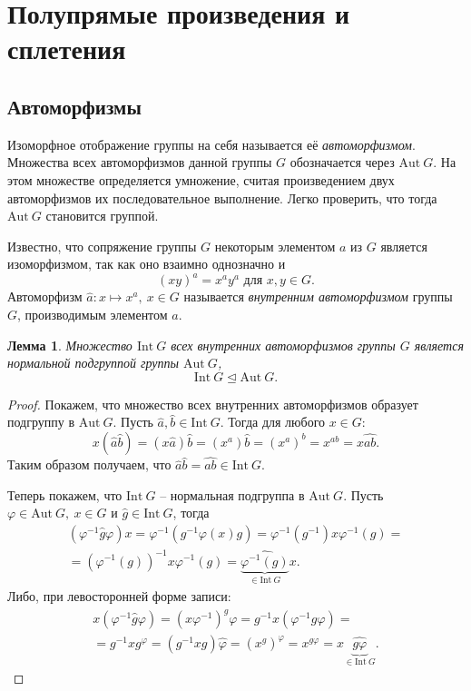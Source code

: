 \documentclass{article}
\newtheorem{lemma}{Лемма}[section]
\begin{document}
\newpage

\section{Полупрямые произведения и сплетения}

\subsection{Автоморфизмы}

Изоморфное отображение группы на себя называется её \textit{автоморфизмом}. Множества всех автоморфизмов данной группы $G$ обозначается через $\mathrm{Aut} \ G$. На этом множестве определяется умножение, считая произведением двух автоморфизмов их последовательное выполнение. Легко проверить, что тогда $\mathrm{Aut} \ G$ становится группой.

Известно, что сопряжение группы $G$ некоторым элементом $a$ из $G$ является изоморфизмом, так как оно взаимно однозначно и $$ (xy)^a = x^a y^a \text{ для } x,y \in G.$$
Автоморфизм $ \widehat{a}: x \mapsto x^a, \ x \in G $ называется \textit{внутренним автоморфизмом} группы $G$, производимым элементом $a$. 
\begin{lemma}
    Множество $\mathrm{Int} \ G$ всех внутренних автоморфизмов группы $G$ является нормальной подгруппой группы $\mathrm{Aut} \ G$, $$ \mathrm{Int} \ G \trianglelefteq \mathrm{Aut} \ G. $$
\end{lemma}
\begin{proof}
    Покажем, что множество всех внутренних автоморфизмов образует подгруппу в $\mathrm{Aut} \ G$. Пусть $\widehat{a}, \widehat{b} \in \mathrm{Int} \ G$. Тогда для любого $x \in G$:
    $$ x(\widehat{a} \widehat{b}) = (x \widehat{a}) \widehat{b} = (x^a) \widehat{b} = (x^a)^b = x^{ab} = x \widehat{ab}. $$
    Таким образом получаем, что $\widehat{a} \widehat{b} = \widehat{ab} \in \mathrm{Int} \ G$.

    Теперь покажем, что $\mathrm{Int} \ G$ -- нормальная подгруппа в $\mathrm{Aut} \ G$.
    Пусть $\varphi \in \mathrm{Aut} \ G, \ x \in G$ и $\widehat{g} \in \mathrm{Int} \ G$, тогда
    \begin{multline*}
        (\varphi^{-1} \widehat{g} \varphi)x = \varphi^{-1} (g^{-1} \varphi(x) g) = \varphi^{-1}(g^{-1}) x \varphi^{-1}(g) = \\
        = (\varphi^{-1}(g))^{-1} x \varphi^{-1} (g) = \underbrace{\widehat{\varphi^{-1}(g)}}_{\in \mathrm{Int} \ G} x.
    \end{multline*}
    Либо, при левосторонней форме записи:
    \begin{multline*}
        x(\varphi^{-1} \widehat{g} \varphi) = (x \varphi^{-1})^g \varphi = g^{-1} x (\varphi^{-1} g \varphi) = \\
        = g^{-1} x g^{\varphi} = (g^{-1} x g) \widehat{\varphi} = (x^g)^{\varphi} = x^{g \varphi} = x \underbrace{\widehat{g \varphi}}_{\in \mathrm{Int} \ G}.
    \end{multline*}
\end{proof}
\end{document}
